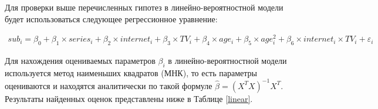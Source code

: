 \documentclass[a4paper,12pt]{article}
\begin{document}
	 \vspace{0.2cm}
	
	Для проверки выше перечисленных гипотез в линейно-вероятностной модели будет использоваться следующее регрессионное уравнение:
	
	\begin{align*}
		sub_i = \beta_0+\beta_1 \times series_i+ \beta_2 \times internet _i+ \beta_3 \times TV_i + \beta_4 \times age_i + \beta_5 \times age_i^2 +\beta_6 \times internet_i \times TV_i + \varepsilon_i
	\end{align*}
	
	Для нахождения оцениваемых параметров $\beta_i$ в линейно-вероятностной модели используется метод наименьших квадратов (МНК), то есть параметры оцениваются и находятся аналитически по такой формуле $\hat\beta = (X^TX)^{-1}X^T$. Результаты найденных оценок представлены ниже в Таблице \ref{linear}.
	
\end{document}
